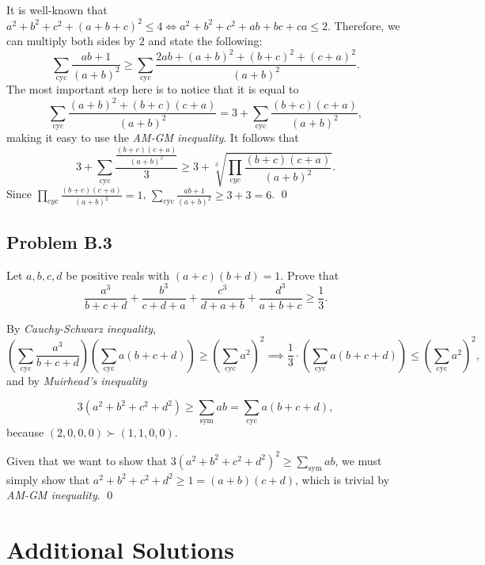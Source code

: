 \documentclass[12pt]{article}
\newcommand{\cmark}{\textcolor{color5}{\ding{51}}} %
\begin{document}
      It is well-known that $a^2 + b^2 + c^2 + (a+b+c)^2 \le 4 \iff a^2 + b^2 + c^2 + ab + bc + ca \le 2$. Therefore,
      we can multiply both sides by $2$ and state the following:
      \[
        \sum_{\text{cyc}} \frac{ab+1}{(a+b)^2} \ge \sum_{\text{cyc}} \frac{2ab+(a+b)^2+(b+c)^2+(c+a)^2}{(a+b)^2}.
      \]
      The most important step here is to notice that it is equal to
      \[
        \sum_{\text{cyc}} \frac{(a+b)^2+(b+c)(c+a)}{(a+b)^2} = 3+\sum_{\text{cyc}} \frac{(b+c)(c+a)}{(a+b)^2},
      \]
      making it easy to use the \textit{AM-GM inequality}. It follows that
      \[
        3+\sum_{\text{cyc}} \frac{\frac{(b+c)(c+a)}{(a+b)^2}}{3} \ge 3+\sqrt[3]{\prod_{cyc} \frac{(b+c)(c+a)}{(a+b)^2}}.
      \]
      Since $\prod_{cyc} \frac{(b+c)(c+a)}{(a+b)^2} = 1$, $\sum_{\text{cyc}} \frac{ab+1}{(a+b)^2} \ge 3 + 3 = 6$. \qed
    \clearpage

    \subsection{Problem B.3 \cmark}
      \begin{tcolorbox}[problembox]
         Let $a, b, c, d$ be positive reals with $(a+c)(b+d) = 1$. Prove that
          \[
            \frac{a^3}{b+c+d} + \frac{b^3}{c+d+a} + \frac{c^3}{d+a+b} + \frac{d^3}{a+b+c} \ge \frac13.
          \]
      \end{tcolorbox}
      By \textit{Cauchy-Schwarz inequality},
      \[
        \left(\sum_{\text{cyc}} \frac{a^3}{b+c+d} \right) \left(\sum_{\text{cyc}} a(b+c+d)\right) \ge \left(\sum_{\text{cyc}} a^2\right)^2
        \implies \frac{1}{3} \cdot \left(\sum_{\text{cyc}} a(b+c+d)\right) \le \left(\sum_{\text{cyc}} a^2\right)^2,
      \]
      and by \textit{Muirhead's inequality}

      \[
        3(a^2+b^2+c^2+d^2) \ge \sum_{\text{sym}} ab = \sum_{\text{cyc}} a(b+c+d),
      \]
      because $(2,0,0,0) \succ (1,1,0,0)$.

      Given that we want to show that $3(a^2+b^2+c^2+d^2)^2 \ge \sum_{\text{sym}} ab$, we must simply show that
      $a^2+b^2+c^2+d^2 \ge 1 = (a+b)(c+d)$, which is trivial by \textit{AM-GM inequality}. \qed
  \clearpage

  \section{\textsf{Additional Solutions}}
\end{document}
